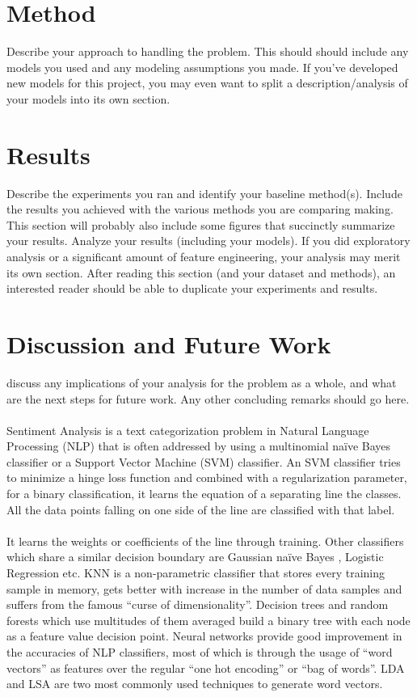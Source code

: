 \documentclass[11pt, oneside]{article}
\begin{document}
\section{Method}
Describe your approach to handling the problem. This should should include any models you used and any modeling assumptions you made. If you’ve developed new models for this project, you may even want to split a description/analysis of your models into its own section.
\section{Results}
Describe the experiments you ran and identify your baseline method(s). Include the results you achieved with the various methods you are comparing making. This section will probably also include some figures that succinctly summarize your results. Analyze your results (including your models). If you did exploratory analysis or a significant amount of feature engineering, your analysis may merit its own section. After reading this section (and your dataset and methods), an interested reader should be able to duplicate your experiments and results.
\section{Discussion and Future Work}
discuss any implications of your analysis for the problem as a whole, and what are the next steps for future work. Any other concluding remarks should go here.
\paragraph{}
Sentiment Analysis is a text categorization problem in Natural Language Processing (NLP) that is often addressed by using a multinomial naïve Bayes classifier or a Support Vector Machine (SVM) classifier.  An SVM classifier tries to minimize a hinge loss function and combined with a regularization parameter, for a binary classification, it learns the equation of a separating line the classes. All the data points falling on one side of the line are classified with that label.
\paragraph{}
It learns the weights or coefficients of the line through training. Other classifiers which share a similar decision boundary are Gaussian naïve Bayes , Logistic Regression etc. KNN is a non-parametric classifier that stores every training sample in memory, gets better with increase in the number of data samples and suffers from the famous “curse of dimensionality”. Decision trees and random forests which use multitudes of them averaged build a binary tree with each node as a feature value decision point.
Neural networks provide good improvement in the accuracies of NLP classifiers, most of which is through the usage of “word vectors” as features over the regular “one hot encoding” or “bag of words”. LDA and LSA are two most commonly used techniques to generate word vectors.
\end{document}
